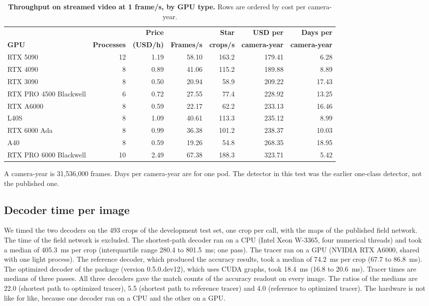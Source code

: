 \begin{table}[!htbp]
\centering
\caption{\textbf{Throughput on streamed video at 1 frame/s, by GPU type.} Rows are ordered by cost per camera-year.}
\label{tab:gpus}
{\small
\begin{tabular}{|l|r|r|r|r|r|r|}
\hline
 & & \textbf{Price} & & \textbf{Star} & \textbf{USD per} & \textbf{Days per} \\
\textbf{GPU} & \textbf{Processes} & \textbf{(USD/h)} & \textbf{Frames/s} & \textbf{crops/s} & \textbf{camera-year} & \textbf{camera-year} \\ \thickhline
RTX 5090 & 12 & 1.19 & 58.10 & 163.2 & 179.41 & 6.28 \\ \hline
RTX 4090 & 8 & 0.89 & 41.06 & 115.2 & 189.88 & 8.89 \\ \hline
RTX 3090 & 8 & 0.50 & 20.94 & 58.9 & 209.22 & 17.43 \\ \hline
RTX PRO 4500 Blackwell & 6 & 0.72 & 27.55 & 77.4 & 228.92 & 13.25 \\ \hline
RTX A6000 & 8 & 0.59 & 22.17 & 62.2 & 233.13 & 16.46 \\ \hline
L40S & 8 & 1.09 & 40.61 & 113.3 & 235.12 & 8.99 \\ \hline
RTX 6000 Ada & 8 & 0.99 & 36.38 & 101.2 & 238.37 & 10.03 \\ \hline
A40 & 8 & 0.59 & 19.26 & 54.8 & 268.35 & 18.95 \\ \hline
RTX PRO 6000 Blackwell & 10 & 2.49 & 67.38 & 188.3 & 323.71 & 5.42 \\ \hline
\end{tabular}
}
\begin{flushleft}\small
A camera-year is 31,536,000 frames.
Days per camera-year are for one pod.
The detector in this test was the earlier one-class detector, not the published one.
\end{flushleft}
\end{table}

\subsection*{Decoder time per image}

We timed the two decoders on the 493 crops of the development test set, one crop per call, with the maps of the published field network.
The time of the field network is excluded.
The shortest-path decoder ran on a CPU (Intel Xeon W-3365, four numerical threads) and took a median of 405.3~ms per crop (interquartile range 280.4 to 801.5~ms; one pass).
The tracer ran on a GPU (NVIDIA RTX A6000, shared with one light process).
The reference decoder, which produced the accuracy results, took a median of 74.2~ms per crop (67.7 to 86.8~ms).
The optimized decoder of the package (version 0.5.0.dev12), which uses CUDA graphs, took 18.4~ms (16.8 to 20.6~ms).
Tracer times are medians of three passes.
All three decoders gave the match counts of the accuracy readout on every image.
The ratios of the medians are 22.0 (shortest path to optimized tracer), 5.5 (shortest path to reference tracer) and 4.0 (reference to optimized tracer).
The hardware is not like for like, because one decoder ran on a CPU and the other on a GPU.

